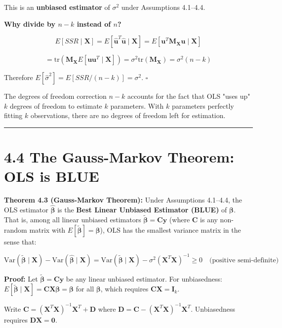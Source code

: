 This is an \textbf{unbiased estimator} of $\sigma^2$ under Assumptions 4.1--4.4.

\textbf{Why divide by $n - k$ instead of $n$?}

\[
E[SSR \mid \mathbf{X}] = E[\hat{\mathbf{u}}^T\hat{\mathbf{u}} \mid \mathbf{X}] = E[\mathbf{u}^T\mathbf{M_X}\mathbf{u} \mid \mathbf{X}]
\]

\[
= \text{tr}(\mathbf{M_X} E[\mathbf{u}\mathbf{u}^T \mid \mathbf{X}]) = \sigma^2 \text{tr}(\mathbf{M_X}) = \sigma^2 (n - k)
\]

Therefore $E[\hat{\sigma}^2] = E[SSR/(n-k)] = \sigma^2$. $\square$

The degrees of freedom correction $n - k$ accounts for the fact that OLS "uses up" $k$ degrees of freedom to estimate $k$ parameters. With $k$ parameters perfectly fitting $k$ observations, there are no degrees of freedom left for estimation.

\medskip\hrule\medskip

\section{4.4 The Gauss-Markov Theorem: OLS is BLUE}

\textbf{Theorem 4.3 (Gauss-Markov Theorem):} Under Assumptions 4.1--4.4, the OLS estimator $\hat{\boldsymbol{\beta}}$ is the \textbf{Best Linear Unbiased Estimator (BLUE)} of $\boldsymbol{\beta}$. That is, among all linear unbiased estimators $\tilde{\boldsymbol{\beta}} = \mathbf{C}\mathbf{y}$ (where $\mathbf{C}$ is any non-random matrix with $E[\tilde{\boldsymbol{\beta}}] = \boldsymbol{\beta}$), OLS has the smallest variance matrix in the sense that:

\[
\text{Var}(\tilde{\boldsymbol{\beta}} \mid \mathbf{X}) - \text{Var}(\hat{\boldsymbol{\beta}} \mid \mathbf{X}) = \text{Var}(\tilde{\boldsymbol{\beta}} \mid \mathbf{X}) - \sigma^2 (\mathbf{X}^T\mathbf{X})^{-1} \geq 0 \quad \text{(positive semi-definite)}
\]

\textbf{Proof:} Let $\tilde{\boldsymbol{\beta}} = \mathbf{C}\mathbf{y}$ be any linear unbiased estimator. For unbiasedness: $E[\tilde{\boldsymbol{\beta}} \mid \mathbf{X}] = \mathbf{C}\mathbf{X}\boldsymbol{\beta} = \boldsymbol{\beta}$ for all $\boldsymbol{\beta}$, which requires $\mathbf{C}\mathbf{X} = \mathbf{I}_k$.

Write $\mathbf{C} = (\mathbf{X}^T\mathbf{X})^{-1}\mathbf{X}^T + \mathbf{D}$ where $\mathbf{D} = \mathbf{C} - (\mathbf{X}^T\mathbf{X})^{-1}\mathbf{X}^T$. Unbiasedness requires $\mathbf{D}\mathbf{X} = \mathbf{0}$.

